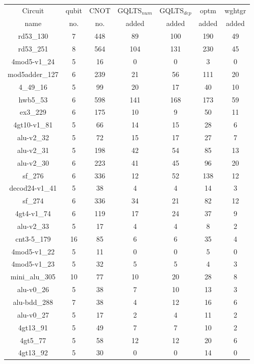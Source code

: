 \documentclass[runningheads]{llncs}
\begin{document}
	\begin{table}[H]
		\begin{center}  
		\begin{tabular}{|c|c|c|c|c|c|c|}
		\hline
		Circuit &  qubit  & CNOT &GQLTS$_{num}$& GQLTS$_{dep}$  & optm 	 & wghtgr 	\\
		 name	&   no. 	&	no. & added&  added &  added 	&  added\\
		\hline
		rd53\_130 & 7 & 448 & 89 & 100 & 190 & 49 \\ 
rd53\_251 & 8 & 564 & 104 & 131 & 230 & 45 \\ 
4mod5-v1\_24 & 5 & 16 & 0 & 0 & 3 & 0 \\ 
mod5adder\_127 & 6 & 239 & 21 & 56 & 111 & 20 \\ 
4\_49\_16 & 5 & 99 & 20 & 17 & 40 & 10 \\ 
hwb5\_53 & 6 & 598 & 141 & 168 & 173 & 59 \\ 
ex3\_229 & 6 & 175 & 10 & 9 & 50 & 11 \\ 
4gt10-v1\_81 & 5 & 66 & 14 & 15 & 28 & 6 \\ 
alu-v2\_32 & 5 & 72 & 15 & 17 & 27 & 7 \\ 
alu-v2\_31 & 5 & 198 & 42 & 54 & 85 & 13 \\ 
alu-v2\_30 & 6 & 223 & 41 & 45 & 96 & 20 \\ 
sf\_276 & 6 & 336 & 12 & 52 & 138 & 12 \\ 
decod24-v1\_41 & 5 & 38 & 4 & 4 & 14 & 3 \\ 
sf\_274 & 6 & 336 & 34 & 21 & 82 & 12 \\ 
4gt4-v1\_74 & 6 & 119 & 17 & 24 & 37 & 9 \\ 
alu-v2\_33 & 5 & 17 & 4 & 4 & 8 & 2 \\ 
cnt3-5\_179 & 16 & 85 & 6 & 6 & 35 & 4 \\ 
4mod5-v1\_22 & 5 & 11 & 0 & 0 & 5 & 0 \\ 
4mod5-v1\_23 & 5 & 32 & 5 & 5 & 4 & 3 \\ 
mini\_alu\_305 & 10 & 77 & 10 & 20 & 28 & 8 \\ 
alu-v0\_26 & 5 & 38 & 7 & 10 & 13 & 3 \\ 
alu-bdd\_288 & 7 & 38 & 4 & 12 & 16 & 6 \\ 
alu-v0\_27 & 5 & 17 & 2 & 4 & 11 & 2 \\ 
4gt13\_91 & 5 & 49 & 7 & 7 & 10 & 2 \\ 
4gt5\_77 & 5 & 58 & 12 & 12 & 20 & 6 \\ 
4gt13\_92 & 5 & 30 & 0 & 0 & 14 & 0 \\ 

\end{tabular}
\end{center}
\end{table}
\end{document}
